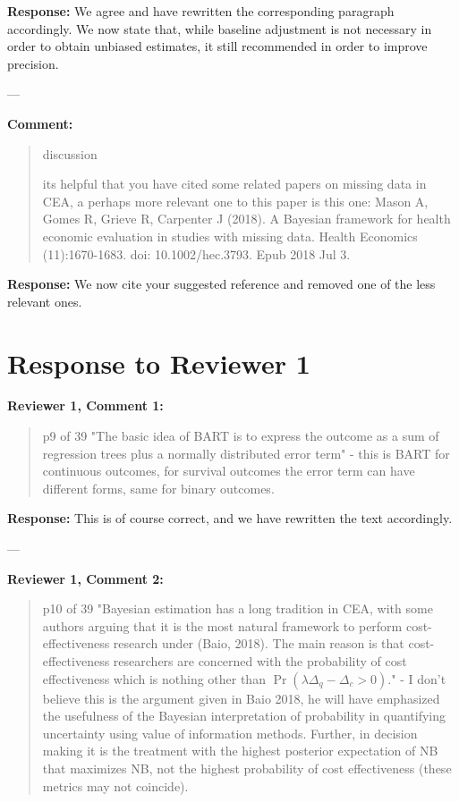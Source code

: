 \documentclass[11pt]{article}
\begin{document}
\textbf{Response:}  
We agree and have rewritten the corresponding paragraph accordingly. We now state that, while baseline adjustment is not necessary in order to obtain unbiased estimates, it still recommended in order to improve precision.

---

\textbf{Comment:}  
\begin{quote}
discussion

its helpful that you have cited some related papers on missing data in CEA, a perhaps more relevant one to this paper is this one: Mason A, Gomes R, Grieve R, Carpenter J (2018). A Bayesian framework for health economic evaluation in studies with missing data. Health Economics (11):1670-1683. doi: 10.1002/hec.3793. Epub 2018 Jul 3.
\end{quote}

\textbf{Response:}  
We now cite your suggested reference and removed one of the less relevant ones.

\section*{Response to Reviewer 1}

\textbf{Reviewer 1, Comment 1:}
\begin{quote}
p9 of 39 "The basic idea of BART is to express the outcome as a sum of regression
trees plus a normally distributed error term" - this is BART for continuous outcomes, for survival outcomes the error term can have different forms, same for binary outcomes.
\end{quote}

\textbf{Response:}  
This is of course correct, and we have rewritten the text accordingly.

---

\textbf{Reviewer 1, Comment 2:}
\begin{quote}
p10 of 39 "Bayesian estimation has a long tradition in CEA, with some authors arguing that it is the most natural framework to perform cost-effectiveness research under (Baio, 2018). The main reason is that cost-effectiveness researchers are concerned with the probability of cost effectiveness which is nothing other than $\Pr(\lambda \Delta_q - \Delta_c > 0)$." - I don't believe this is the argument given in Baio 2018, he will have emphasized the usefulness of the Bayesian interpretation of probability in quantifying uncertainty using value of information methods. Further, in decision making it is the treatment with the highest posterior expectation of NB that maximizes NB, not the highest probability of cost effectiveness (these metrics may not coincide).
\end{quote}
\end{document}
